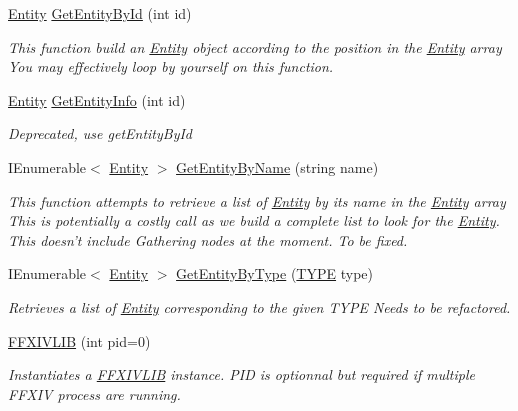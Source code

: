 \begin{DoxyCompactItemize}
\item 
\hyperlink{classffxivlib_1_1_entity}{Entity} \hyperlink{classffxivlib_1_1_f_f_x_i_v_l_i_b_a707e78d2924dd2694ec104b2ee6e1bb6}{Get\-Entity\-By\-Id} (int id)
\begin{DoxyCompactList}\small\item\em This function build an \hyperlink{classffxivlib_1_1_entity}{Entity} object according to the position in the \hyperlink{classffxivlib_1_1_entity}{Entity} array You may effectively loop by yourself on this function. \end{DoxyCompactList}\item 
\hyperlink{classffxivlib_1_1_entity}{Entity} \hyperlink{classffxivlib_1_1_f_f_x_i_v_l_i_b_abf21279e4f445a6d4609a7b1ab4c5c64}{Get\-Entity\-Info} (int id)
\begin{DoxyCompactList}\small\item\em Deprecated, use get\-Entity\-By\-Id \end{DoxyCompactList}\item 
I\-Enumerable$<$ \hyperlink{classffxivlib_1_1_entity}{Entity} $>$ \hyperlink{classffxivlib_1_1_f_f_x_i_v_l_i_b_a8986a3f2a5a3d4d2680ae779e3bb68fd}{Get\-Entity\-By\-Name} (string name)
\begin{DoxyCompactList}\small\item\em This function attempts to retrieve a list of \hyperlink{classffxivlib_1_1_entity}{Entity} by its name in the \hyperlink{classffxivlib_1_1_entity}{Entity} array This is potentially a costly call as we build a complete list to look for the \hyperlink{classffxivlib_1_1_entity}{Entity}. This doesn't include Gathering nodes at the moment. To be fixed. \end{DoxyCompactList}\item 
I\-Enumerable$<$ \hyperlink{classffxivlib_1_1_entity}{Entity} $>$ \hyperlink{classffxivlib_1_1_f_f_x_i_v_l_i_b_a5290e1392e9cca47455d4fa215c8cb84}{Get\-Entity\-By\-Type} (\hyperlink{namespaceffxivlib_aaa4e86d1ea6dbc1661147e6616256e68}{T\-Y\-P\-E} type)
\begin{DoxyCompactList}\small\item\em Retrieves a list of \hyperlink{classffxivlib_1_1_entity}{Entity} corresponding to the given T\-Y\-P\-E Needs to be refactored. \end{DoxyCompactList}\item 
\hyperlink{classffxivlib_1_1_f_f_x_i_v_l_i_b_ac9deecbc7f2ceeac2b48b06620e8a665}{F\-F\-X\-I\-V\-L\-I\-B} (int pid=0)
\begin{DoxyCompactList}\small\item\em Instantiates a \hyperlink{classffxivlib_1_1_f_f_x_i_v_l_i_b}{F\-F\-X\-I\-V\-L\-I\-B} instance. P\-I\-D is optionnal but required if multiple F\-F\-X\-I\-V process are running. \end{DoxyCompactList}\item 

\end{DoxyCompactItemize}
